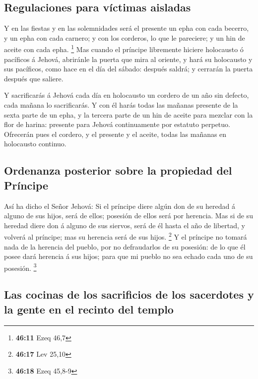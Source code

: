 \hypertarget{regulaciones-para-vuxedctimas-aisladas}{%
\subsection{Regulaciones para víctimas
aisladas}\label{regulaciones-para-vuxedctimas-aisladas}}

 Y en las fiestas y en las solemnidades será el presente un
epha con cada becerro, y un epha con cada carnero; y con los corderos,
lo que le pareciere; y un hin de aceite con cada epha. \footnote{\textbf{46:11}
  Ezeq 46,7}  Mas cuando el príncipe libremente hiciere
holocausto ó pacíficos á Jehová, abriránle la puerta que mira al
oriente, y hará su holocausto y sus pacíficos, como hace en el día del
sábado: después saldrá; y cerrarán la puerta después que saliere.

 Y sacrificarás á Jehová cada día en holocausto un cordero
de un año sin defecto, cada mañana lo sacrificarás.  Y con
él harás todas las mañanas presente de la sexta parte de un epha, y la
tercera parte de un hin de aceite para mezclar con la flor de harina:
presente para Jehová continuamente por estatuto perpetuo. 
Ofrecerán pues el cordero, y el presente y el aceite, todas las mañanas
en holocausto continuo.

\hypertarget{ordenanza-posterior-sobre-la-propiedad-del-pruxedncipe}{%
\subsection{Ordenanza posterior sobre la propiedad del
Príncipe}\label{ordenanza-posterior-sobre-la-propiedad-del-pruxedncipe}}

 Así ha dicho el Señor Jehová: Si el príncipe diere algún
don de su heredad á alguno de sus hijos, será de ellos; posesión de
ellos será por herencia.  Mas si de su heredad diere don á
alguno de sus siervos, será de él hasta el año de libertad, y volverá al
príncipe; mas su herencia será de sus hijos. \footnote{\textbf{46:17}
  Lev 25,10}  Y el príncipe no tomará nada de la herencia
del pueblo, por no defraudarlos de su posesión: de lo que él posee dará
herencia á sus hijos; para que mi pueblo no sea echado cada uno de su
posesión. \footnote{\textbf{46:18} Ezeq 45,8-9}

\hypertarget{las-cocinas-de-los-sacrificios-de-los-sacerdotes-y-la-gente-en-el-recinto-del-templo}{%
\subsection{Las cocinas de los sacrificios de los sacerdotes y la gente
en el recinto del
templo}\label{las-cocinas-de-los-sacrificios-de-los-sacerdotes-y-la-gente-en-el-recinto-del-templo}}

